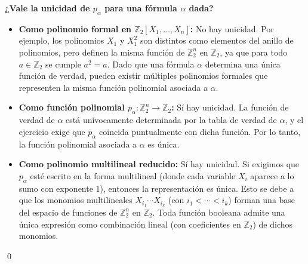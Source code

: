    \textbf{¿Vale la unicidad de $p_\alpha$ para una fórmula $\alpha$ dada?}
    \begin{itemize}
       \item \textbf{Como polinomio formal en $\mathbb{Z}_2[X_1,\dots,X_n]$:} No hay unicidad. Por ejemplo, los polinomios $X_1$ y $X_1^2$ son distintos como elementos del anillo de polinomios, pero definen la misma función de $\mathbb{Z}_2^n$ en $\mathbb{Z}_2$, ya que para todo $a\in\mathbb{Z}_2$ se cumple $a^2=a$. Dado que una fórmula $\alpha$ determina una única función de verdad, pueden existir múltiples polinomios formales que representen la misma función polinomial asociada a $\alpha$.
       \item \textbf{Como función polinomial $\overline{p}_\alpha: \mathbb{Z}_2^n \to \mathbb{Z}_2$:} Sí hay unicidad. La función de verdad de $\alpha$ está unívocamente determinada por la tabla de verdad de $\alpha$, y el ejercicio exige que $\overline{p}_\alpha$ coincida puntualmente con dicha función. Por lo tanto, la función polinomial asociada a $\alpha$ es única.
       \item \textbf{Como polinomio multilineal reducido:} Sí hay unicidad. Si exigimos que $p_\alpha$ esté escrito en la forma multilineal (donde cada variable $X_i$ aparece a lo sumo con exponente $1$), entonces la representación es única. Esto se debe a que los monomios multilineales $X_{i_1}\cdots X_{i_k}$ (con $i_1<\cdots<i_k$) forman una base del espacio de funciones de $\mathbb{Z}_2^n$ en $\mathbb{Z}_2$. Toda función booleana admite una única expresión como combinación lineal (con coeficientes en $\mathbb{Z}_2$) de dichos monomios.
    \end{itemize}
    \hfill \qed
